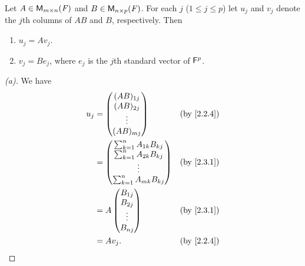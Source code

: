 \begin{thm}\label{2.13}
	Let \(A \in \mathsf{M}_{{m} \times n}({\mathit{F}})\) and \(B \in \mathsf{M}_{{n} \times p}({\mathit{F}})\).
	For each \(j\) (\(1 \leq j \leq p\)) let \(u_j\) and \(v_j\) denote the \(j\)th columns of \(AB\) and \(B\), respectively.
	Then
	\begin{enumerate}
		\item \(u_j = A v_j\).
		\item \(v_j = B e_j\), where \(e_j\) is the \(j\)th standard vector of \(\mathsf{F}^p\).
	\end{enumerate}
\end{thm}

\begin{proof}[(a)]
	We have
	\begin{align*}
		u_j & = \begin{pmatrix}
			        (AB)_{1 j} \\
			        (AB)_{2 j} \\
			        \vdots     \\
			        (AB)_{m j}
		        \end{pmatrix}                 &  & \by{2.2.4}   \\
		    & = \begin{pmatrix}
			        \sum_{k = 1}^n A_{1 k} B_{k j} \\
			        \sum_{k = 1}^n A_{2 k} B_{k j} \\
			        \vdots                         \\
			        \sum_{k = 1}^n A_{m k} B_{k j}
		        \end{pmatrix} &  & \by{2.3.1}                  \\
		    & = A \begin{pmatrix}
			          B_{1 j} \\
			          B_{2 j} \\
			          \vdots  \\
			          B_{n j}
		          \end{pmatrix}               &  & \by{2.3.1}   \\
		    & = A v_j.                          &  & \by{2.2.4}
	\end{align*}
\end{proof}


